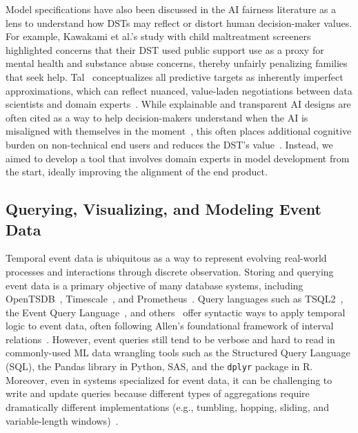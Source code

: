 Model specifications have also been discussed in the AI fairness literature as a lens to understand how DSTs may reflect or distort human decision-maker values.
For example, Kawakami et al.'s \cite{Kawakami2022partnerships} study with child maltreatment screeners highlighted concerns that their DST used public support use as a proxy for mental health and substance abuse concerns, thereby unfairly penalizing families that seek help. 
Tal~\cite{tal_target_2023} conceptualizes all predictive targets as inherently imperfect approximations, which can reflect nuanced, value-laden negotiations between data scientists and domain experts~\cite{passi_problem_2019}.
While explainable and transparent AI designs are often cited as a way to help decision-makers understand when the AI is misaligned with themselves in the moment~\cite{Zytek2021,Kawakami2022dis}, this often places additional cognitive burden on non-technical end users and reduces the DST's value~\cite{Sivaraman2023}.
Instead, we aimed to develop a tool that involves domain experts in model development from the start, ideally improving the alignment of the end product. %

\subsection{Querying, Visualizing, and Modeling Event Data}
\label{sec:related-event-data}

Temporal event data is ubiquitous as a way to represent evolving real-world processes and interactions through discrete observation. 
Storing and querying event data is a primary objective of many database systems, including OpenTSDB~\cite{opentsdb}, Timescale~\cite{timescale}, and Prometheus~\cite{prometheus}.
Query languages such as TSQL2~\cite{bohlen_how_2006}, the Event Query Language~\cite{wolf_introducing_2019}, and others~\cite{rozsnyai_sari-sql_2009,bry_high-level_2006} offer syntactic ways to apply temporal logic to event data, often following Allen's foundational framework of interval relations~\cite{allen_maintaining_1983}.
However, event queries still tend to be verbose and hard to read in commonly-used ML data wrangling tools such as the Structured Query Language (SQL), the Pandas library in Python, SAS, and the \texttt{dplyr} package in R. 
Moreover, even in systems specialized for event data, it can be challenging to write and update queries because different types of aggregations require dramatically different implementations (e.g., tumbling, hopping, sliding, and variable-length windows)~\cite{bohlen_how_2006}.

